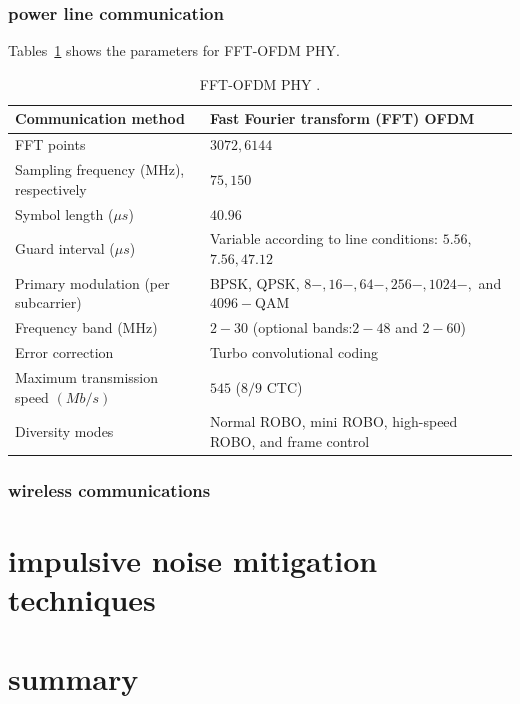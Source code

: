 			\subsubsection{power line communication}
				 Tables~\ref{tab2:FFT-PHY} shows the parameters for FFT-OFDM PHY.
				\begin{table}[h]
					\renewcommand{\arraystretch}{1.7} %
					\renewcommand{\tabcolsep}{0.5cm}%
					\caption{FFT-OFDM PHY \protect \cite{2008-gallirecent}.}
					\label{tab2:FFT-PHY}
					\begin{small}
						\resizebox{\linewidth}{!}
						{
						\begin{tabular}{|l|l|}
							\hline \textbf{Communication method} & \textbf{Fast Fourier transform (FFT) OFDM} \\ 
							\hline FFT points & $ 3072, 6144 $ \\ 
							\hline \parbox{4cm}{Sampling frequency (MHz), respectively} & $ 75, 150 $ \\ 
							\hline Symbol length ($\mu s$) & $ 40.96 $ \\ 
							\hline Guard interval ($\mu s$) & Variable according to line conditions: $  5.56 $, $ 7.56, 47.12 $ \\ 
							\hline \parbox{4cm}{Primary modulation (per subcarrier)} & BPSK, QPSK, $ 8-, 16-, 64-, 256-, 1024-, $ and $ 4096- $QAM \\ 
							\hline Frequency band (MHz) & $ 2-30 $ (optional bands:$  2-48 $ and $ 2-60 $) \\ 
							\hline Error correction & Turbo convolutional coding \\ 
							\hline \parbox{4cm}{Maximum transmission speed $(Mb/s)$} & $ 545 $ ($ 8/9 $ CTC) \\ 
							\hline Diversity modes & \parbox{7cm}{Normal ROBO, mini ROBO, high-speed ROBO, and frame control}  \\ 
							\hline 
						\end{tabular} 
						}
					\end{small} %
				\end{table}
	\subsubsection{wireless communications}
	\section{impulsive noise mitigation techniques} \label{sec2:LR}
	\section{summary} \label{sec2:summary}







